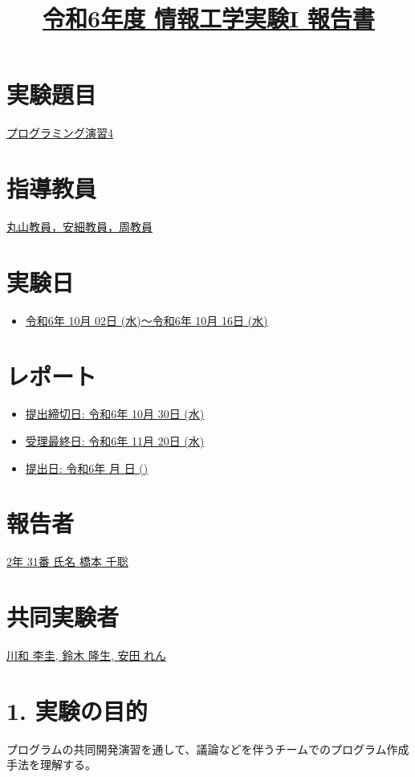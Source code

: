 \documentclass[a4paper,11pt]{jsarticle}
\title{\underline{令和6年度 情報工学実験I 報告書}}
\date{\empty}
\author{\empty}
\begin{document}
\maketitle
\section*{実験題目}
\underline{プログラミング演習4}

\section*{指導教員}
\underline{丸山教員，安細教員，周教員}

\section*{実験日}
\begin{itemize}[left=2em]
    \item \underline{令和6年 10月 02日 (水)〜令和6年 10月 16日 (水)}
\end{itemize}

\section*{レポート}
\begin{itemize}[left=2em]
    \item \underline{提出締切日: 令和6年 10月 30日 (水)}
    \item \underline{受理最終日: 令和6年 11月 20日 (水)}
    \item \underline{提出日: 令和6年 \underline{\hspace{1cm}} 月 \underline{\hspace{1cm}} 日 (\underline{\hspace{1cm}})}
\end{itemize}

\section*{報告者}
\underline{2年 31番 氏名 橋本 千聡}

\section*{共同実験者}
\underline{川和 李圭, 鈴木 隆生, 安田 れん}

\newpage


\section*{1. 実験の目的}
プログラムの共同開発演習を通して、議論などを伴うチームでのプログラム作成手法を理解する。
\end{document}
